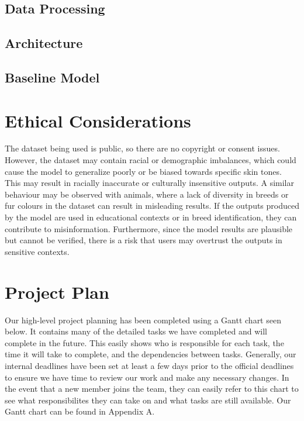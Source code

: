 \documentclass{article} %
\begin{document}
\subsection{Data Processing}

\subsection{Architecture}

\subsection{Baseline Model}

\section{Ethical Considerations}
\label{ethical}

The dataset being used is public, so there are no copyright or consent issues. However, the dataset may contain racial or demographic imbalances, which could cause the model 
to generalize poorly or be biased towards specific skin tones. This may result in racially inaccurate or culturally insensitive outputs. A similar behaviour may be observed with 
animals, where a lack of diversity in breeds or fur colours in the dataset can result in misleading results. If the outputs produced by the model are used in educational contexts 
or in breed identification, they can contribute to misinformation. Furthermore, since the model results are plausible but cannot be verified, there is a risk that users may 
overtrust the outputs in sensitive contexts.

\section{Project Plan}
\label{project_plan}

Our high-level project planning has been completed using a Gantt chart seen below. It contains many of the detailed tasks we have completed and will complete in the future. This
easily shows who is responsible for each task, the time it will take to complete, and the dependencies between tasks. Generally, our internal deadlines have been set at least a 
few days prior to the official deadlines to ensure we have time to review our work and make any necessary changes. In the event that a new member joins the team, they can easily
refer to this chart to see what responsibilites they can take on and what tasks are still available. Our Gantt chart can be found in Appendix A.
\end{document}
